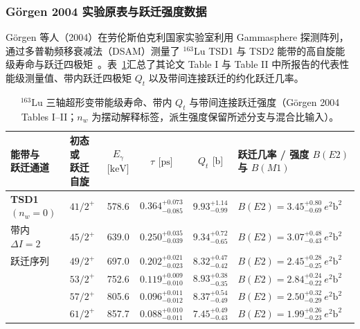 \subsubsection{Görgen 2004 实验原表与跃迁强度数据}

Görgen 等人（2004）在劳伦斯伯克利国家实验室利用 Gammasphere 探测阵列，通过多普勒频移衰减法（DSAM）测量了 $^{163}\mathrm{Lu}$ TSD1 与 TSD2 能带的高自旋能级寿命与跃迁四极矩~\cite{campaign-g07-gorgen-2004-163lu-quadrupole-moments}。表~\ref{tab:4-4-lu163-sample}汇总了其论文 Table I 与 Table II 中所报告的代表性能级测量值、带内跃迁四极矩 $Q_t$ 以及带间连接跃迁的约化跃迁几率。

\begin{table}[!htbp]
\centering
\small
\caption{$^{163}\mathrm{Lu}$ 三轴超形变带能级寿命、带内 $Q_t$ 与带间连接跃迁强度（Görgen 2004 Tables I–II；$n_w$ 为摆动解释标签，派生强度保留所述分支与混合比输入）。}\label{tab:4-4-lu163-sample}
\begin{tabularx}{\textwidth}{p{2.2cm} p{2.0cm} c c c >{\raggedright\arraybackslash}X}
\hline\hline
\shortstack{能带与\\跃迁通道} & \shortstack{初态或\\跃迁自旋} & \shortstack{$E_\gamma$\\$\text{[keV]}$} & \shortstack{$\tau$\\$\text{[ps]}$} & \shortstack{$Q_t$\\$\text{[b]}$} & \shortstack{跃迁几率 / 强度\\$B(E2)$ 与 $B(M1)$} \\
\hline
\shortstack[l]{\textbf{TSD1}\\$(n_w=0)$} & $41/2^+$ & 578.6 & $0.364_{-0.085}^{+0.073}$ & $9.93_{-0.99}^{+1.14}$ & $B(E2) = 3.45_{-0.69}^{+0.80}\ e^2\mathrm{b}^2$ \\
带内 $\Delta I = 2$ & $45/2^+$ & 639.0 & $0.250_{-0.039}^{+0.035}$ & $9.34_{-0.65}^{+0.72}$ & $B(E2) = 3.07_{-0.43}^{+0.48}\ e^2\mathrm{b}^2$ \\
跃迁序列 & $49/2^+$ & 697.0 & $0.202_{-0.023}^{+0.021}$ & $8.32_{-0.42}^{+0.47}$ & $B(E2) = 2.45_{-0.25}^{+0.28}\ e^2\mathrm{b}^2$ \\
& $53/2^+$ & 752.6 & $0.119_{-0.010}^{+0.009}$ & $8.93_{-0.35}^{+0.38}$ & $B(E2) = 2.84_{-0.22}^{+0.24}\ e^2\mathrm{b}^2$ \\
& $57/2^+$ & 805.6 & $0.096_{-0.012}^{+0.011}$ & $8.37_{-0.49}^{+0.54}$ & $B(E2) = 2.50_{-0.29}^{+0.32}\ e^2\mathrm{b}^2$ \\
& $61/2^+$ & 857.7 & $0.088_{-0.011}^{+0.010}$ & $7.45_{-0.43}^{+0.49}$ & $B(E2) = 1.99_{-0.23}^{+0.26}\ e^2\mathrm{b}^2$ \\

\end{tabularx}
\end{table}
